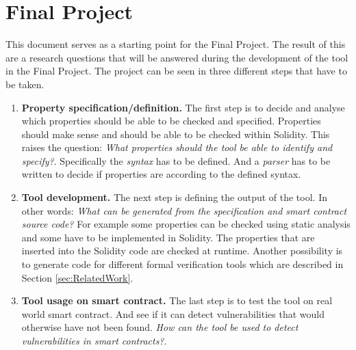 \documentclass[a4paper]{article}
\begin{document}
\section{Final Project}
This document serves as a starting point for the Final Project. The result of this are a research questions that will be answered during the development of the tool in the Final Project. The project can be seen in three different steps that have to be taken.
\begin{enumerate}
    \item \textbf{Property specification/definition.}
    The first step is to decide and analyse which properties should be able to be checked and specified. Properties should make sense and should be able to be checked within Solidity. This raises the question:
    \textit{What properties should the tool be able to identify and specify?}. Specifically the \textit{syntax} has to be defined. And a \textit{parser} has to be written to decide if properties are according to the defined syntax. 
    \item \textbf{Tool development.}
    The next step is defining the output of the tool. In other words: \textit{What can be generated from the specification and smart contract source code?} For example some properties can be checked using static analysis and some have to be implemented in Solidity. The properties that are inserted into the Solidity code are checked at runtime. Another possibility is to generate code for different formal verification tools which are described in Section \ref{sec:RelatedWork}.
    \item \textbf{Tool usage on smart contract.}
    The last step is to test the tool on real world smart contract. And see if it can detect vulnerabilities that would otherwise have not been found. \textit{How can the tool be used to detect vulnerabilities in smart contracts?}.
\end{enumerate}




\end{document}

